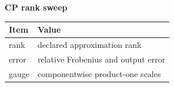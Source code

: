 \begin{center}
\textbf{CP rank sweep}\par\smallskip
\begin{tabular}{ll}
\toprule
Item & Value \\
\midrule
rank & declared approximation rank \\
error & relative Frobenius and output error \\
gauge & componentwise product-one scales \\
\bottomrule
\end{tabular}
\end{center}
